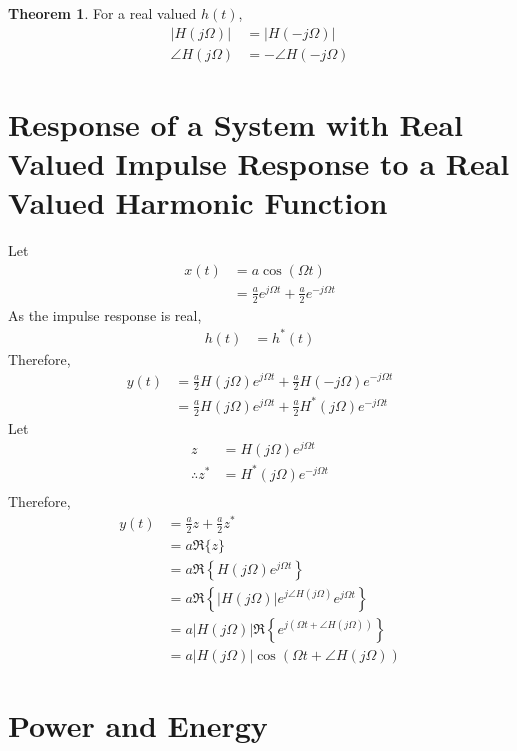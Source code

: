 \documentclass[titlepage, fleqn, a4paper, 12pt, twoside]{article}
\theoremstyle{definition}
\theoremstyle{theorem}
\newtheorem{theorem}{Theorem}
\begin{document}
\begin{theorem}
	For a real valued $h(t)$,
	\begin{align*}
		\left| H(j \Omega) \right| &= \left| H(-j \Omega) \right|\\
		\angle H(j \Omega) &= -\angle H(-j \Omega)
	\end{align*}
\end{theorem}

\section{Response of a System with Real Valued Impulse Response to a Real Valued Harmonic Function}

Let
\begin{align*}
	x(t) &= a \cos(\Omega t)\\
	&= \frac{a}{2} e^{j \Omega t} + \frac{a}{2} e^{-j \Omega t}
\end{align*}
As the impulse response is real,
\begin{align*}
	h(t) &= h^*(t)
\end{align*}
Therefore,
\begin{align*}
	y(t) &= \frac{a}{2} H(j \Omega) e^{j \Omega t} + \frac{a}{2} H(-j \Omega) e^{-j \Omega t}\\
	&= \frac{a}{2} H(j \Omega) e^{j \Omega t} + \frac{a}{2} H^*(j \Omega) e^{-j \Omega t}
\end{align*}
Let
\begin{align*}
	z &= H(j \Omega) e^{j \Omega t}\\
	\therefore z^* &= H^*(j \Omega) e^{-j \Omega t}\\
\end{align*}
Therefore,
\begin{align*}
	y(t) &= \frac{a}{2} z + \frac{a}{2} z^*\\
	&= a \Re\{z\}\\
	&= a \Re\left\{ H(j \Omega) e^{j \Omega t} \right\}\\
	&= a \Re\left\{ \left| H(j \Omega) \right| e^{j \angle H(j \Omega)} e^{j \Omega t} \right\}\\
	&= a \left| H(j \Omega) \right| \Re\left\{ e^{j \left( \Omega t + \angle H(j \Omega) \right)} \right\}\\
	&= a \left| H(j \Omega) \right| \cos\left( \Omega t + \angle H(j \Omega) \right)
\end{align*}

\section{Power and Energy}
\end{document}
